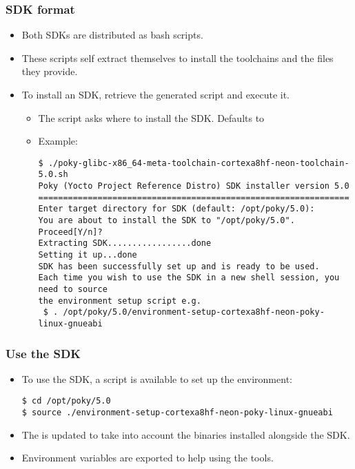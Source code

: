 \begin{frame}[fragile]
  \frametitle{SDK format}
  \begin{itemize}
    \item Both SDKs are distributed as bash scripts.
    \item These scripts self extract themselves to install the
      toolchains and the files they provide.
    \item To install an SDK, retrieve the generated script and execute
      it.
      \begin{itemize}
        \item The script asks where to install the SDK. Defaults to
        \item Example: 
        \begin{block}{}
          \begin{verbatim}
$ ./poky-glibc-x86_64-meta-toolchain-cortexa8hf-neon-toolchain-5.0.sh
Poky (Yocto Project Reference Distro) SDK installer version 5.0
===============================================================
Enter target directory for SDK (default: /opt/poky/5.0):
You are about to install the SDK to "/opt/poky/5.0". Proceed[Y/n]?
Extracting SDK.................done
Setting it up...done
SDK has been successfully set up and is ready to be used.
Each time you wish to use the SDK in a new shell session, you need to source
the environment setup script e.g.
 $ . /opt/poky/5.0/environment-setup-cortexa8hf-neon-poky-linux-gnueabi
          \end{verbatim}
        \end{block}
      \end{itemize}
  \end{itemize}
\end{frame}

\begin{frame}[fragile]
  \frametitle{Use the SDK}
  \begin{itemize}
    \item To use the SDK, a script is available to set up the
      environment:
      \begin{block}{}
        \begin{verbatim}
$ cd /opt/poky/5.0
$ source ./environment-setup-cortexa8hf-neon-poky-linux-gnueabi
        \end{verbatim}
      \end{block}
    \item The  is updated to take into account the binaries
      installed alongside the SDK.
    \item Environment variables are exported to help using the tools.
  \end{itemize}
\end{frame}

